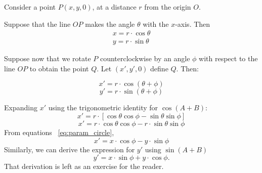 Consider a point \(P(x, y, 0)\), at a distance \(r\) from the origin \(O\).

Suppose that the line \(OP\) makes the angle \(\theta\) with the \(x\)-axis. 
Then 
\begin{equation}
\begin{aligned}
x = r \cdot \cos \theta \\
y =  r \cdot \sin \theta
\end{aligned}    
\label{eq:param_circle}
\end{equation}

\begin{minipage}[t]{0.7\textwidth}
Suppose now that we rotate \(P\) counterclockwise by an angle \(\phi\) with respect to the line \(OP\) to obtain the point \(Q\). Let \((x', y', 0)\) define \(Q\). Then:

\[
x' = r \cdot \cos (\theta + \phi)
\]
\[
y' = r \cdot \sin (\theta + \phi)
\]
\end{minipage}%
\hfill
\begin{minipage}[t]{0.28\textwidth}



\end{minipage}


Expanding \(x'\) using the trigonometric identity for \(\cos(A+B)\):
\[
x' = r \cdot [\cos \theta \cos \phi - \sin \theta \sin \phi]
\]
\[
x' = r \cdot \cos \theta \cos \phi - r \cdot \sin \theta \sin \phi
\]
From equations ~\eqref{eq:param_circle},
\begin{equation}
    x' = x \cdot \cos \phi - y \cdot \sin \phi
\end{equation}
Similarly, we can derive the expression for \(y'\) using \(\sin(A+B)\) 
\begin{equation}
y' = x \cdot \sin \phi + y \cdot \cos \phi.
\end{equation}
That derivation is left as an exercise for the reader.


